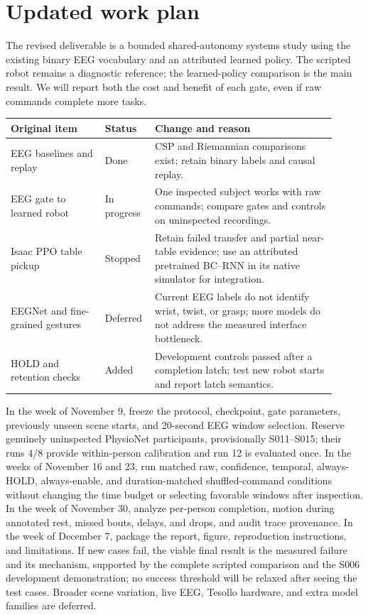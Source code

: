 \documentclass[11pt]{article}
\begin{document}
\section{Updated work plan}
The revised deliverable is a bounded shared-autonomy systems study using the existing binary EEG vocabulary and an attributed learned policy. The scripted robot remains a diagnostic reference; the learned-policy comparison is the main result. We will report both the cost and benefit of each gate, even if raw commands complete more tasks.

\begin{center}\small
\begin{tabular}{@{}p{0.27\linewidth}p{0.12\linewidth}p{0.52\linewidth}@{}}
\toprule
Original item & Status & Change and reason \\
\midrule
EEG baselines and replay & Done & CSP and Riemannian comparisons exist; retain binary labels and causal replay. \\
EEG gate to learned robot & In progress & One inspected subject works with raw commands; compare gates and controls on uninspected recordings. \\
Isaac PPO table pickup & Stopped & Retain failed transfer and partial near-table evidence; use an attributed pretrained BC--RNN in its native simulator for integration. \\
EEGNet and fine-grained gestures & Deferred & Current EEG labels do not identify wrist, twist, or grasp; more models do not address the measured interface bottleneck. \\
HOLD and retention checks & Added & Development controls passed after a completion latch; test new robot starts and report latch semantics. \\
\bottomrule
\end{tabular}
\end{center}

In the week of November 9, freeze the protocol, checkpoint, gate parameters, previously unseen scene starts, and 20-second EEG window selection. Reserve genuinely uninspected PhysioNet participants, provisionally S011--S015; their runs 4/8 provide within-person calibration and run 12 is evaluated once. In the weeks of November 16 and 23, run matched raw, confidence, temporal, always-HOLD, always-enable, and duration-matched shuffled-command conditions without changing the time budget or selecting favorable windows after inspection. In the week of November 30, analyze per-person completion, motion during annotated rest, missed bouts, delays, and drops, and audit trace provenance. In the week of December 7, package the report, figure, reproduction instructions, and limitations. If new cases fail, the viable final result is the measured failure and its mechanism, supported by the complete scripted comparison and the S006 development demonstration; no success threshold will be relaxed after seeing the test cases. Broader scene variation, live EEG, Tesollo hardware, and extra model families are deferred.
\end{document}
